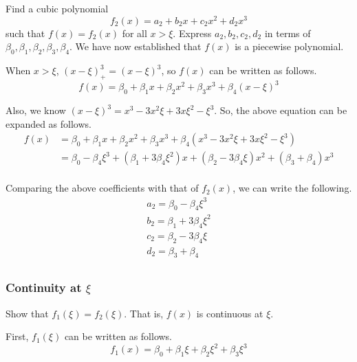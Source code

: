 \documentclass{article}
\begin{document}
\question
Find a cubic polynomial 
\[
f_2\left(x\right) = a_2 + b_2 x + c_2 x^2 + d_2 x^3
\]
such that $f\left(x\right) = f_2\left(x\right)$ for all $x > \xi$.
Express $a_2, b_2, c_2, d_2$ in terms of $\beta_0, \beta_1, \beta_2, \beta_3, \beta_4$.
We have now established that $f\left(x\right)$ is a piecewise polynomial.

\answer
When $x > \xi$, $\left(x - \xi\right)^3_+ = \left(x - \xi\right)^3$, so $f\left(x\right)$ can be written as follows.
\[
    f\left(x\right) = \beta_0 + \beta_1 x + \beta_2 x^2 + \beta_3 x^3 + \beta_4 \left(x - \xi\right)^3
\]

Also, we know $\left(x - \xi\right)^3 = x^3 - 3 x^2 \xi + 3 x \xi^2 - \xi^3$.
So, the above equation can be expanded as follows.
\begin{equation*}
    \begin{split}
        f\left(x\right) &= \beta_0 + \beta_1 x + \beta_2 x^2 + \beta_3 x^3 + \beta_4 \left( x^3 - 3 x^2 \xi + 3 x \xi^2 - \xi^3 \right) \\
        &= \beta_0 - \beta_4 \xi^3  + \left(\beta_1 + 3 \beta_4 \xi^2 \right) x + \left(\beta_2 - 3 \beta_4 \xi \right) x^2 + \left(\beta_3 + \beta_4\right) x^3\\
    \end{split}
\end{equation*}

Comparing the above coefficients with that of $f_2\left(x\right)$, we can write the following.
\begin{gather*}
    a_2 = \beta_0 - \beta_4 \xi^3 \\
    b_2 = \beta_1 + 3 \beta_4 \xi^2 \\
    c_2 = \beta_2 - 3 \beta_4 \xi\\
    d_2 = \beta_3 + \beta_4\\
\end{gather*}

\subsubsection{Continuity at $\xi$}

\question
Show that $f_1\left(\xi\right) = f_2\left(\xi\right)$.
That is, $f\left(x\right)$ is continuous at $\xi$.

\answer
First, $f_1\left(\xi\right)$ can be written as follows.
\[
    f_1\left(x\right) = \beta_0 + \beta_1 \xi + \beta_2 \xi^2 + \beta_3 \xi^3
\]
\end{document}
